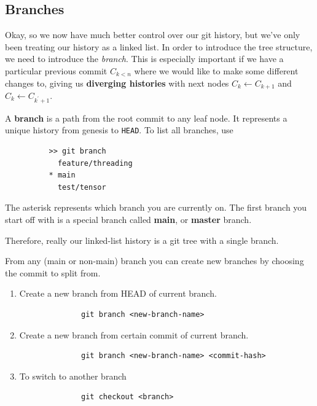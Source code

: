 \documentclass{article}
\begin{document}
  \subsection{Branches} 

      Okay, so we now have much better control over our git history, but we've only been treating our history as a linked list. In order to introduce the tree structure, we need to introduce the \textit{branch}. This is especially important if we have a particular previous commit $C_{k < n}$ where we would like to make some different changes to, giving us \textbf{diverging histories} with next nodes $C_k \leftarrow C_{k+1}$ and $C_k \leftarrow C_{k^\prime + 1}$. 
      
      \begin{definition}[Branch]
        A \textbf{branch} is a path from the root commit to any leaf node. It represents a unique history from genesis to \texttt{HEAD}. To list all branches, use 
        \begin{lstlisting}
          >> git branch 
            feature/threading
          * main
            test/tensor
        \end{lstlisting} 
        The asterisk represents which branch you are currently on. The first branch you start off with is a special branch called \textbf{main}, or \textbf{master} branch. 
      \end{definition} 

      Therefore, really our linked-list history is a git tree with a single branch. 

      \begin{definition}
        From any (main or non-main) branch you can create new branches by choosing the commit to split from. 
        \begin{enumerate}
          \item Create a new branch from HEAD of current branch. 
            \begin{lstlisting}
              git branch <new-branch-name> 
            \end{lstlisting}

          \item Create a new branch from certain commit of current branch. 
            \begin{lstlisting}
              git branch <new-branch-name> <commit-hash>
            \end{lstlisting} 

          \item To switch to another branch 
            \begin{lstlisting}
              git checkout <branch> 
            \end{lstlisting}
        \end{enumerate}
      \end{definition} 
\end{document}
